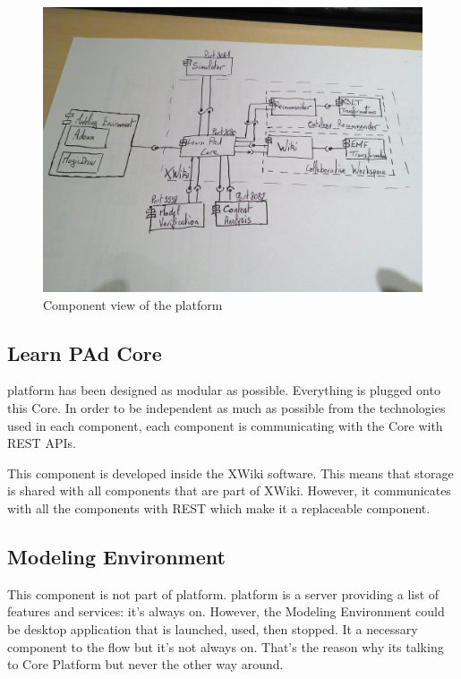 \documentclass{learnpad}
\begin{document}
\begin{figure}[!htp]
	\centering
	\includegraphics[width=.6\paperwidth,keepaspectratio]{figures/learnpad-architecture.jpg}
	\caption{Component view of the \learnpad platform}
	\label{fig:component-view}
\end{figure}

\subsection{Learn PAd Core}
\learnpad platform has been designed as modular as possible.  Everything is
plugged onto this \learnpad Core.  In order to be independent as much as
possible from the technologies used in each component, each component is
communicating with the \learnpad Core with REST APIs.

This component is developed inside the XWiki software.  This means that storage
is shared with all components that are part of XWiki.  However, it communicates
with all the components with REST which make it a replaceable component.

\subsection{Modeling Environment}
This component is not part of \learnpad platform.  \learnpad platform is a
server providing a list of features and services: it's always on.  However, the
Modeling Environment could be desktop application that is launched, used, then
stopped.  It a necessary component to the \learnpad flow but it's not always on.
That's the reason why its talking to \learnpad Core Platform but never the other
way around.
\end{document}
